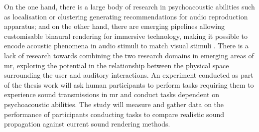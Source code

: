 On the one hand, there is a large body of research in psychoacoustic abilities such as localisation or clustering \citep{lee2011relationship} generating recommendations for audio reproduction apparatus; and on the other hand, there are emerging pipelines allowing customisable binaural rendering for immersive technology, making it possible to encode acoustic phenomena in audio stimuli to match visual stimuli \citep{plinge2018six}. There is a lack of research towards combining the two research domains in emerging areas of \acrshort{mr}, exploring the potential in the relationship between the physical space surrounding the user and auditory interactions. An experiment conducted as part of the thesis work will ask human participants to perform tasks requiring them to experience sound transmissions in \acrshort{mr} and conduct tasks dependent on psychoacoustic abilities. The study will measure and gather data on the performance of participants conducting tasks to compare realistic sound propagation against current sound rendering methods.\par

